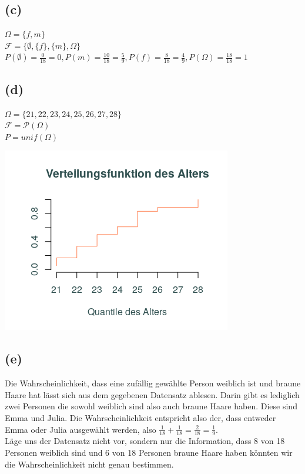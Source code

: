 \documentclass[a4paper]{scrartcl}
\begin{document}
\subsection*{(c)}
$\Omega = \lbrace f,m\rbrace$\\
$\mathcal{F} = \lbrace \emptyset, \lbrace f \rbrace, \lbrace m\rbrace, \Omega\rbrace$\\
$ P(\emptyset) = \frac{0}{18} = 0, P(m) = \frac{10}{18} = \frac{5}{9}, P(f) = \frac{8}{18} = \frac{4}{9}, P(\Omega) = \frac{18}{18} = 1$


\subsection*{(d)}
$\Omega = \lbrace21,22,23,24,25,26,27,28 \rbrace$\\
$\mathcal{F} = \mathcal{P}(\Omega)$\\
$ P=unif(\Omega)$

\begin{center}
	\includegraphics*[scale = 0.5]{alter_verteilungsfunktion.png}
\end{center}


\subsection*{(e)}
Die Wahrscheinlichkeit, dass eine zufällig gewählte Person weiblich ist und braune Haare hat lässt sich aus dem gegebenen Datensatz ablesen. Darin gibt es lediglich zwei Personen die sowohl weiblich sind also auch braune Haare haben. Diese sind Emma und Julia. Die Wahrscheinlichkeit entspricht also der, dass entweder Emma oder Julia ausgewählt werden, also $\frac{1}{18} + \frac{1}{18} = \frac{2}{18} = \frac{1}{9}$. \\
Läge uns der Datensatz nicht vor, sondern nur die Information, dass 8 von 18 Personen weiblich sind und 6 von 18 Personen braune Haare haben könnten wir die Wahrscheinlichkeit nicht genau bestimmen.
\end{document}
